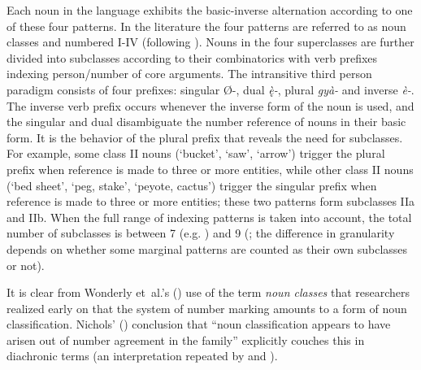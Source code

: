 \documentclass[output=collectionpaper]{langsci/langscibook}
\begin{document}
Each noun in the language exhibits the basic-inverse alternation according to one of these four patterns. In the  literature the four patterns are referred to as noun classes and numbered I-IV (following \citealt{Wonderly1954}). Nouns in the four superclasses are further divided into subclasses according to their combinatorics with verb prefixes indexing person/number of core arguments. The intransitive third person paradigm consists of four prefixes: singular Ø-, dual \textit{ę̀-}, plural \textit{gyà-} and inverse \textit{è-}. The inverse verb prefix occurs whenever the inverse form of the noun is used, and the singular and dual disambiguate the number reference of nouns in their basic form. It is the behavior of the plural prefix that reveals the need for subclasses. For example, some class II nouns (`bucket', `saw', `arrow') trigger the plural prefix when reference is made to three or more entities, while other class II nouns (`bed sheet', `peg, stake', `peyote, cactus') trigger the singular prefix when reference is made to three or more entities; these two patterns form subclasses IIa and IIb. When the full range of indexing patterns is taken into account, the total number of subclasses is between 7 (e.g. \citealt{Watkins1984}) and 9 (\citealt{Harbour2008}; the difference in granularity depends on whether some marginal patterns are counted as their own subclasses or not).

It is clear from Wonderly et~al.'s (\citealt*{Wonderly1954}) use of the term \textit{noun classes} that researchers realized early on that the  system of number marking amounts to a form of noun classification. Nichols' (\citeyear[141]{Nichols1992}) conclusion that ``noun classification appears to have arisen out of number agreement in the  family'' explicitly couches this in diachronic terms (an interpretation repeated by \citealt[377]{Aikhenvald2000} and \citealt[451]{Luraghi2011}).
\end{document}
